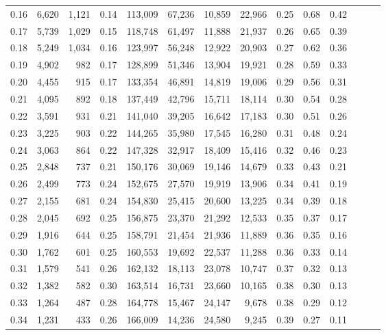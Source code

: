 \begin{tabular}{rrrrrrrrrrrrrr}
0.16 &  6,620 &  1,121 &  0.14 &  113,009 &   67,236 &  10,859 &  22,966 &  0.25 &  0.68 &      0.42 \\
0.17 &  5,739 &  1,029 &  0.15 &  118,748 &   61,497 &  11,888 &  21,937 &  0.26 &  0.65 &      0.39 \\
0.18 &  5,249 &  1,034 &  0.16 &  123,997 &   56,248 &  12,922 &  20,903 &  0.27 &  0.62 &      0.36 \\
0.19 &  4,902 &    982 &  0.17 &  128,899 &   51,346 &  13,904 &  19,921 &  0.28 &  0.59 &      0.33 \\
0.20 &  4,455 &    915 &  0.17 &  133,354 &   46,891 &  14,819 &  19,006 &  0.29 &  0.56 &      0.31 \\
0.21 &  4,095 &    892 &  0.18 &  137,449 &   42,796 &  15,711 &  18,114 &  0.30 &  0.54 &      0.28 \\
0.22 &  3,591 &    931 &  0.21 &  141,040 &   39,205 &  16,642 &  17,183 &  0.30 &  0.51 &      0.26 \\
0.23 &  3,225 &    903 &  0.22 &  144,265 &   35,980 &  17,545 &  16,280 &  0.31 &  0.48 &      0.24 \\
0.24 &  3,063 &    864 &  0.22 &  147,328 &   32,917 &  18,409 &  15,416 &  0.32 &  0.46 &      0.23 \\
0.25 &  2,848 &    737 &  0.21 &  150,176 &   30,069 &  19,146 &  14,679 &  0.33 &  0.43 &      0.21 \\
0.26 &  2,499 &    773 &  0.24 &  152,675 &   27,570 &  19,919 &  13,906 &  0.34 &  0.41 &      0.19 \\
0.27 &  2,155 &    681 &  0.24 &  154,830 &   25,415 &  20,600 &  13,225 &  0.34 &  0.39 &      0.18 \\
0.28 &  2,045 &    692 &  0.25 &  156,875 &   23,370 &  21,292 &  12,533 &  0.35 &  0.37 &      0.17 \\
0.29 &  1,916 &    644 &  0.25 &  158,791 &   21,454 &  21,936 &  11,889 &  0.36 &  0.35 &      0.16 \\
0.30 &  1,762 &    601 &  0.25 &  160,553 &   19,692 &  22,537 &  11,288 &  0.36 &  0.33 &      0.14 \\
0.31 &  1,579 &    541 &  0.26 &  162,132 &   18,113 &  23,078 &  10,747 &  0.37 &  0.32 &      0.13 \\
0.32 &  1,382 &    582 &  0.30 &  163,514 &   16,731 &  23,660 &  10,165 &  0.38 &  0.30 &      0.13 \\
0.33 &  1,264 &    487 &  0.28 &  164,778 &   15,467 &  24,147 &   9,678 &  0.38 &  0.29 &      0.12 \\
0.34 &  1,231 &    433 &  0.26 &  166,009 &   14,236 &  24,580 &   9,245 &  0.39 &  0.27 &      0.11 \\

\end{tabular}
